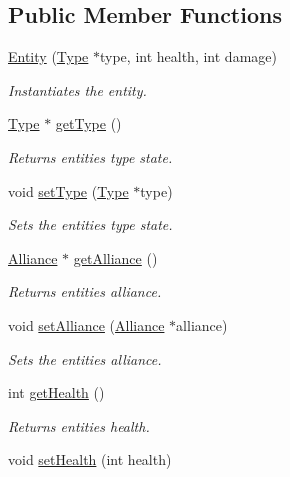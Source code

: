 \subsection*{Public Member Functions}
\begin{DoxyCompactItemize}
\item 
\hyperlink{classEntity_a68e832f69650ee80b83228a038eb66f0}{Entity} (\hyperlink{classType}{Type} $\ast$type, int health, int damage)
\begin{DoxyCompactList}\small\item\em Instantiates the entity. \end{DoxyCompactList}\item 
\hyperlink{classType}{Type} $\ast$ \hyperlink{classEntity_a3a9c9e298bfc47b726a2d9ce44dd7464}{get\+Type} ()
\begin{DoxyCompactList}\small\item\em Returns entities type state. \end{DoxyCompactList}\item 
void \hyperlink{classEntity_a5d04ce64c9ca214900422865e298e36c}{set\+Type} (\hyperlink{classType}{Type} $\ast$type)
\begin{DoxyCompactList}\small\item\em Sets the entities type state. \end{DoxyCompactList}\item 
\hyperlink{classAlliance}{Alliance} $\ast$ \hyperlink{classEntity_aa101047a4bc312b697b65b4c3a39ffc5}{get\+Alliance} ()
\begin{DoxyCompactList}\small\item\em Returns entities alliance. \end{DoxyCompactList}\item 
void \hyperlink{classEntity_af804dcaa600e770cf0e2b4537f6fba23}{set\+Alliance} (\hyperlink{classAlliance}{Alliance} $\ast$alliance)
\begin{DoxyCompactList}\small\item\em Sets the entities alliance. \end{DoxyCompactList}\item 
int \hyperlink{classEntity_a2b0140ae8c77c0e3654b070ee3c7fe57}{get\+Health} ()
\begin{DoxyCompactList}\small\item\em Returns entities health. \end{DoxyCompactList}\item 
void \hyperlink{classEntity_a7dae281ff92be9bc98672cafe05c77ab}{set\+Health} (int health)

\end{DoxyCompactItemize}

